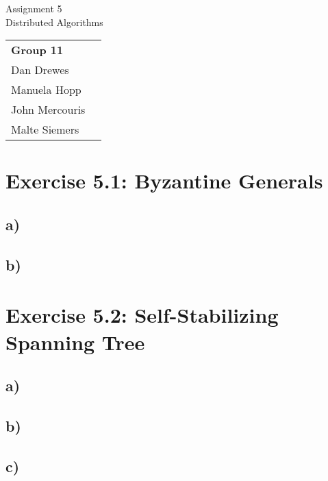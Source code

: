 \documentclass[12pt,a4paper]{article}
\begin{document}
\begin{center}
  \Large Assignment 5 \\
  \large Distributed Algorithms
\end{center}
\begin{flushright}
  \begin{tabular}{ll}
    \textbf{Group 11} \\
    Dan Drewes        \\ 
    Manuela Hopp      \\ 
    John Mercouris    \\
    Malte Siemers     \\
  \end{tabular} 
\end{flushright}

\section*{Exercise 5.1: Byzantine Generals}
\subsection*{a)} %
\subsection*{b)} %
\section*{Exercise 5.2: Self-Stabilizing Spanning Tree}
\subsection*{a)} %
\subsection*{b)} %
\subsection*{c)} %
\end{document}

